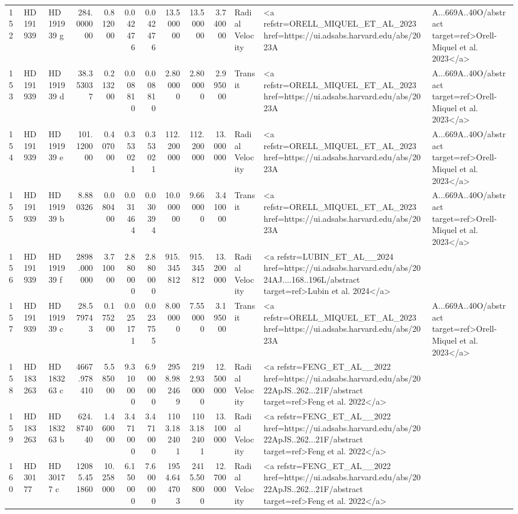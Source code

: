 \begin{tabular}{lllrrrrrrrll}
152 & HD 191939 & HD 191939 g & 284.000000 & 0.812000 & 0.042476 & 0.042476 & 13.500000 & 13.500000 & 3.740000 & Radial Velocity & <a refstr=ORELL_MIQUEL_ET_AL_2023 href=https://ui.adsabs.harvard.edu/abs/2023A&A...669A..40O/abstract target=ref>Orell-Miquel et al. 2023</a> \\
153 & HD 191939 & HD 191939 d & 38.353037 & 0.213200 & 0.008810 & 0.008810 & 2.800000 & 2.800000 & 2.995000 & Transit & <a refstr=ORELL_MIQUEL_ET_AL_2023 href=https://ui.adsabs.harvard.edu/abs/2023A&A...669A..40O/abstract target=ref>Orell-Miquel et al. 2023</a> \\
154 & HD 191939 & HD 191939 e & 101.120000 & 0.407000 & 0.353021 & 0.353021 & 112.200000 & 112.200000 & 13.000000 & Radial Velocity & <a refstr=ORELL_MIQUEL_ET_AL_2023 href=https://ui.adsabs.harvard.edu/abs/2023A&A...669A..40O/abstract target=ref>Orell-Miquel et al. 2023</a> \\
155 & HD 191939 & HD 191939 b & 8.880326 & 0.080400 & 0.031464 & 0.030394 & 10.000000 & 9.660000 & 3.410000 & Transit & <a refstr=ORELL_MIQUEL_ET_AL_2023 href=https://ui.adsabs.harvard.edu/abs/2023A&A...669A..40O/abstract target=ref>Orell-Miquel et al. 2023</a> \\
156 & HD 191939 & HD 191939 f & 2898.000000 & 3.710000 & 2.880000 & 2.880000 & 915.345812 & 915.345812 & 13.200000 & Radial Velocity & <a refstr=LUBIN_ET_AL__2024 href=https://ui.adsabs.harvard.edu/abs/2024AJ....168..196L/abstract target=ref>Lubin et al. 2024</a> \\
157 & HD 191939 & HD 191939 c & 28.579743 & 0.175200 & 0.025171 & 0.023755 & 8.000000 & 7.550000 & 3.195000 & Transit & <a refstr=ORELL_MIQUEL_ET_AL_2023 href=https://ui.adsabs.harvard.edu/abs/2023A&A...669A..40O/abstract target=ref>Orell-Miquel et al. 2023</a> \\
158 & HD 183263 & HD 183263 c & 4667.978410 & 5.585000 & 9.310000 & 6.900000 & 2958.982469 & 2192.930000 & 12.500000 & Radial Velocity & <a refstr=FENG_ET_AL__2022 href=https://ui.adsabs.harvard.edu/abs/2022ApJS..262...21F/abstract target=ref>Feng et al. 2022</a> \\
159 & HD 183263 & HD 183263 b & 624.874040 & 1.460000 & 3.471000 & 3.471000 & 1103.182401 & 1103.182401 & 13.100000 & Radial Velocity & <a refstr=FENG_ET_AL__2022 href=https://ui.adsabs.harvard.edu/abs/2022ApJS..262...21F/abstract target=ref>Feng et al. 2022</a> \\
160 & HD 30177 & HD 30177 c & 12085.451860 & 10.258000 & 6.150000 & 7.600000 & 1954.644703 & 2415.508000 & 12.700000 & Radial Velocity & <a refstr=FENG_ET_AL__2022 href=https://ui.adsabs.harvard.edu/abs/2022ApJS..262...21F/abstract target=ref>Feng et al. 2022</a> \\

\end{tabular}
